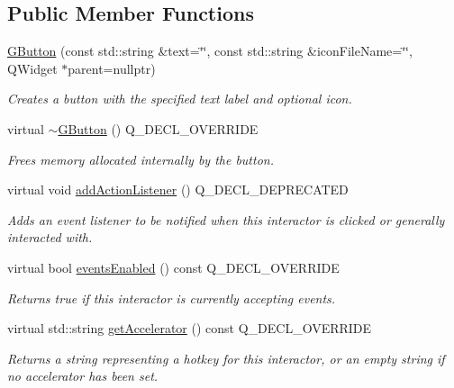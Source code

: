 \subsection*{Public Member Functions}
\begin{DoxyCompactItemize}
\item 
\mbox{\hyperlink{classGButton_aff3f5308477262143eb2a857e7549e31}{G\+Button}} (const std\+::string \&text=\char`\"{}\char`\"{}, const std\+::string \&icon\+File\+Name=\char`\"{}\char`\"{}, Q\+Widget $\ast$parent=nullptr)
\begin{DoxyCompactList}\small\item\em Creates a button with the specified text label and optional icon. \end{DoxyCompactList}\item 
virtual \mbox{\hyperlink{classGButton_a3946882d60361aca156856b7443125df}{$\sim$\+G\+Button}} () Q\+\_\+\+D\+E\+C\+L\+\_\+\+O\+V\+E\+R\+R\+I\+DE
\begin{DoxyCompactList}\small\item\em Frees memory allocated internally by the button. \end{DoxyCompactList}\item 
virtual void \mbox{\hyperlink{classGInteractor_a02f20ea6edfa0671f31c4c648a253833}{add\+Action\+Listener}} () Q\+\_\+\+D\+E\+C\+L\+\_\+\+D\+E\+P\+R\+E\+C\+A\+T\+ED
\begin{DoxyCompactList}\small\item\em Adds an event listener to be notified when this interactor is clicked or generally interacted with. \end{DoxyCompactList}\item 
virtual bool \mbox{\hyperlink{classGInteractor_ac05ba5b92e2e5146d416fe7f842a0969}{events\+Enabled}} () const Q\+\_\+\+D\+E\+C\+L\+\_\+\+O\+V\+E\+R\+R\+I\+DE
\begin{DoxyCompactList}\small\item\em Returns true if this interactor is currently accepting events. \end{DoxyCompactList}\item 
virtual std\+::string \mbox{\hyperlink{classGButton_a432ca43c59ffb2adc9cb66d43621bc27}{get\+Accelerator}} () const Q\+\_\+\+D\+E\+C\+L\+\_\+\+O\+V\+E\+R\+R\+I\+DE
\begin{DoxyCompactList}\small\item\em Returns a string representing a hotkey for this interactor, or an empty string if no accelerator has been set. \end{DoxyCompactList}\item 

\end{DoxyCompactItemize}

